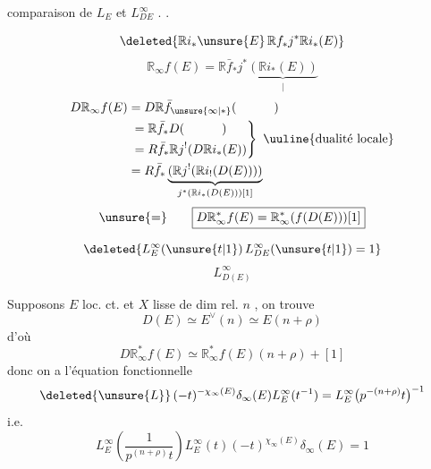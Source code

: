 comparaison  de $L_E$ et $L_{DE}^{\infty}$ . .

\[
\deleted{\mathbb R i_*\unsure{E}\,\mathbb R f_*j^*\mathbb R i_*(E)}
\]
\[
\mathbb R_\infty f(E)=\mathbb R\bar f_*j^*\underbrace{(\mathbb R i_*(E))}_{\big|} 
\]
\[
\begin{aligned}
D\mathbb R_\infty f(E)&=D\mathbb R\bar f_{\unsure{\infty|*}}(\hspace{3em})\\
&\left.\begin{aligned}
&=\mathbb R\bar f_*D(\hspace{3em})\\
&=R\bar f_*\mathbb R j^!(D\mathbb R i_*(E))
\end{aligned}\right\}\ \text{\uuline{dualité locale}}\\
&=R\bar f_*\underbrace{(\mathbb R j^!(\mathbb R i_!(D(E))))}_{j^*(\mathbb R i_*(D(E)))[1]}
\end{aligned}
\]
\[
\unsure{=}\qquad\boxed{D\mathbb R_\infty^* f(E)=\mathbb R_\infty^*(f(D(E)))[1]}
\]

\[
\deleted{L_E^\infty(\unsure{t|1})\,L_{DE}^\infty(\unsure{t|1})=1}
\]
\[
L_{D(E)}^\infty
\]

Supposons $E$ loc. ct.  et $X$ lisse de dim rel. $n$ , on trouve
\[
D(E)\simeq E^\vee(n)\simeq E(n+\rho)
\]
d'où
\[
\boxed{D\mathbb R_\infty^* f(E)\simeq\mathbb R_\infty^* f(E)(n+\rho)+[1]}
\]
donc on a l'équation fonctionnelle
\[
\deleted{\unsure{L}}\,(-t)^{-\chi_\infty(E)}\delta_\infty(E)L_E^\infty(t^{-1})=L_E^\infty\bigl(p^{-(n+\rho)}t\bigr)^{-1}
\]
i.e.
\[
\boxed{L_E^\infty\left(\frac{1}{p^{(n+\rho)}t}\right)L_E^\infty(t)(-t)^{\chi_\infty(E)}\delta_\infty(E)=1}
\]

